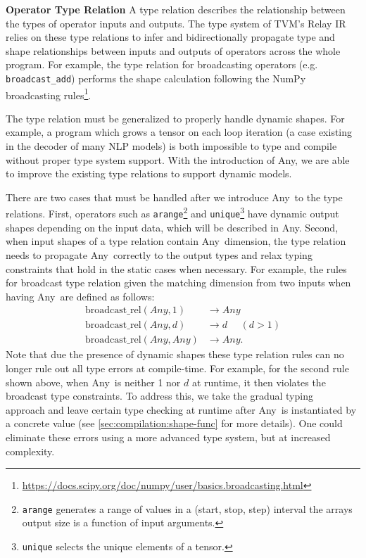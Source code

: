 \noindent
{\bf Operator Type Relation} A type relation describes the relationship between the types of operator inputs and outputs. The type system of TVM's Relay IR relies on these type relations to infer and bidirectionally propagate type and shape relationships between inputs and outputs of operators across the whole program.
For example, the type relation for broadcasting operators (e.g. \texttt{broadcast\_add}) performs the shape calculation following the NumPy broadcasting rules\footnote{\url{https://docs.scipy.org/doc/numpy/user/basics.broadcasting.html}}.

The type relation must be generalized to properly handle dynamic shapes. For example, a program which grows a tensor on each loop iteration (a case existing in the decoder of many NLP models) is both impossible to type and compile without proper type system support. With the introduction of Any, we are able to improve the existing type relations to support dynamic models.

There are two cases that must be handled after we introduce Any~to the type relations.
First, operators such as {\tt arange}\footnote{{\tt arange} generates a range of values in a (start, stop, step) interval the arrays output size is a function of input arguments.} and {\tt unique}\footnote{{\tt unique} selects the unique elements of a tensor.} have dynamic output shapes depending on the input data, which will be described in Any.
Second, when input shapes of a type relation contain Any~dimension, the type relation needs to propagate Any~correctly to the output types and relax typing constraints that hold in the static cases when necessary.
For example, the rules
for broadcast type relation given the matching dimension from two inputs when having Any~are defined as follows:
\begin{align*}
  \textrm{broadcast\_rel}(Any, 1) &\rightarrow Any \\
  \textrm{broadcast\_rel}(Any, d) &\rightarrow d ~~~~~~(d > 1) \\
  \textrm{broadcast\_rel}(Any, Any) &\rightarrow Any.
\end{align*}
Note that due the presence of dynamic shapes these type relation rules can no longer rule out all type errors at compile-time.
For example, for the second rule shown above, when Any~is neither 1 nor $d$ at runtime, it then violates the broadcast type constraints.
To address this, we take the gradual typing~\citep{gradualtyping} approach and leave certain type checking at runtime after Any~is instantiated by a
concrete value (see \autoref{sec:compilation:shape-func} for more details).
One could eliminate these errors using a more advanced type system, but at increased complexity.

